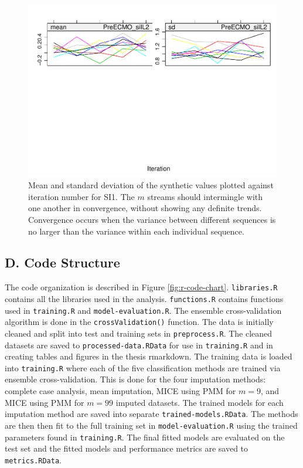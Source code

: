 \documentclass[12pt,]{article}
\newcommand{\appendixE}{ \setcounter{table}{0} \renewcommand{\thetable}{E\arabic{table}} \setcounter{figure}{0} \renewcommand{\thefigure}{E\arabic{figure}} }
\begin{document}
\begin{figure}[H]
{\centering \includegraphics[width=0.75\linewidth]{figure/graphics-unnamed-chunk-16-7} 

}

\caption{\label{fig:converge-mean}Mean and standard deviation of the synthetic values plotted against iteration number for SI1.  The $m$ streams should intermingle with one another in convergence, without showing any definite trends.  Convergence occurs when the variance between different sequences is no larger than the variance within each individual sequence.}\label{fig:unnamed-chunk-167}
\end{figure}

\newpage

\subsection*{D. Code Structure}\label{d.-code-structure}

\appendixE

The code organization is described in Figure \ref{fig:r-code-chart}.
\texttt{libraries.R} contains all the libraries used in the analysis.
\texttt{functions.R} contains functions used in \texttt{training.R} and
\texttt{model-evaluation.R}. The ensemble cross-validation algorithm is
done in the \texttt{crossValidation()} function. The data is initially
cleaned and split into test and training sets in \texttt{preprocess.R}.
The cleaned datasets are saved to \texttt{processed-data.RData} for use
in \texttt{training.R} and in creating tables and figures in the thesis
rmarkdown. The training data is loaded into \texttt{training.R} where
each of the five classification methods are trained via ensemble
cross-validation. This is done for the four imputation methods: complete
case analysis, mean imputation, MICE using PMM for \(m=9\), and MICE
using PMM for \(m=99\) imputed datasets. The trained models for each
imputation method are saved into separate \texttt{trained-models.RData}.
The methods are then then fit to the full training set in
\texttt{model-evaluation.R} using the trained parameters found in
\texttt{training.R}. The final fitted models are evaluated on the test
set and the fitted models and performance metrics are saved to
\texttt{metrics.RData}.
\end{document}
